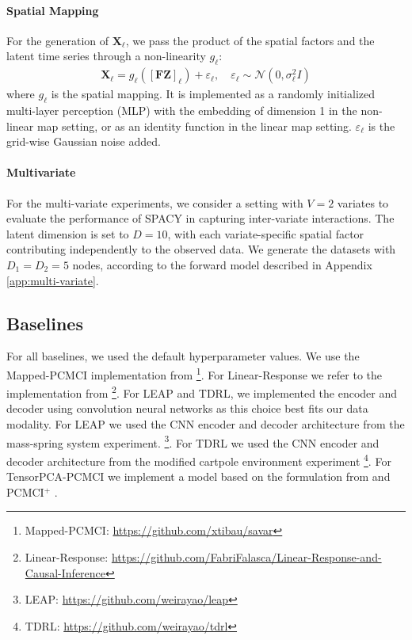 \paragraph{Spatial Mapping} For the generation of $\mathbf{X}_\ell$, we pass the product of the spatial factors and the latent time series through a non-linearity $g_\ell$:
\begin{align}
\mathbf{X}_\ell = g_\ell \left( \left[ \mathbf{F}\mathbf{Z} \right]_\ell \right) + \varepsilon_\ell, \quad
\varepsilon_\ell \sim \mathcal{N}(0, \sigma^2_\ell I)
\end{align}
where $g_\ell$ is the spatial mapping. It is  implemented as a randomly initialized multi-layer perception (MLP) with the embedding of dimension 1 in the non-linear map setting, or as an identity function in the linear map setting. $ \varepsilon_\ell$ is the grid-wise Gaussian noise added. 

\paragraph{Multivariate}

For the multi-variate experiments, we consider a setting with $V = 2$ variates to evaluate the performance of SPACY in capturing inter-variate interactions. The latent dimension is set to $D = 10$, with each variate-specific spatial factor contributing independently to the observed data. We generate the datasets with $D_1=D_2=5$ nodes, according to the forward model described in Appendix \ref{app:multi-variate}.


\subsection{Baselines} 
For all baselines, we used the default
hyperparameter values. We use the Mapped-PCMCI implementation from \citep{xavi2022teleconnection}\footnote{Mapped-PCMCI: \url{https://github.com/xtibau/savar}}. For Linear-Response we refer to the implementation from \citep{Falasca_2024}\footnote{Linear-Response: \url{https://github.com/FabriFalasca/Linear-Response-and-Causal-Inference}}. For LEAP and TDRL, we implemented the encoder and decoder using convolution neural networks as this choice best fits our data modality. For LEAP we used the CNN encoder and decoder architecture from the mass-spring system experiment.
\footnote{LEAP: \url{https://github.com/weirayao/leap}}. For TDRL we used the CNN encoder and decoder architecture from the modified cartpole environment experiment \footnote{TDRL: \url{https://github.com/weirayao/tdrl}}. For TensorPCA-PCMCI we implement a model based on the formulation from \citep{babii2023tensorprincipalcomponentanalysis} and PCMCI$^{+}$ \citep{runge2020pcmci+}.

